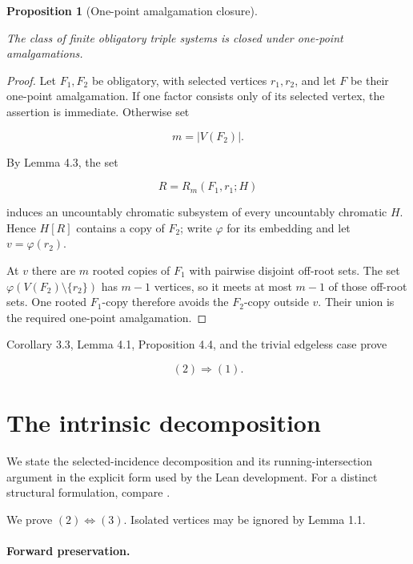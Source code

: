 \documentclass[a4paper,11pt,reqno]{amsart}
\theoremstyle{plain}
\newtheorem{proposition}[theorem]{Proposition}
\theoremstyle{definition}
\theoremstyle{remark}
\begin{document}
\begin{proposition}[One-point amalgamation closure]\label{proposition-4.4-one-point-amalgamation-closure}

The class of finite obligatory triple systems is closed under one-point amalgamations.

\end{proposition}
\begin{proof}
Let \(F_1,F_2\) be obligatory, with selected vertices \(r_1,r_2\), and let \(F\) be their one-point amalgamation. If one factor consists only of its selected vertex, the assertion is immediate. Otherwise set

\[
m=|V(F_2)|.
\]

By Lemma 4.3, the set

\[
R=R_m(F_1,r_1;H)
\]

induces an uncountably chromatic subsystem of every uncountably chromatic \(H\). Hence \(H[R]\) contains a copy of \(F_2\); write \(\varphi\) for its embedding and let \(v=\varphi(r_2)\).

At \(v\) there are \(m\) rooted copies of \(F_1\) with pairwise disjoint off-root sets. The set \(\varphi(V(F_2)\setminus\{r_2\})\) has \(m-1\) vertices, so it meets at most \(m-1\) of those off-root sets. One rooted \(F_1\)-copy therefore avoids the \(F_2\)-copy outside \(v\). Their union is the required one-point amalgamation.
\end{proof}

Corollary 3.3, Lemma 4.1, Proposition 4.4, and the trivial edgeless case prove

\[
(2)\Longrightarrow(1). \tag{4.1}
\]

\section{The intrinsic decomposition}\label{equivalence-of-the-constructive-and-intrinsic-descriptions}

We state the selected-incidence decomposition and its running-intersection
argument in the explicit form used by the Lean development.  For a distinct
structural formulation, compare \citet[Sections~4--5]{li2026}.

We prove \((2)\Longleftrightarrow(3)\). Isolated vertices may be ignored by Lemma 1.1.

\paragraph{Forward preservation.}\label{forward-preservation}
\end{document}
